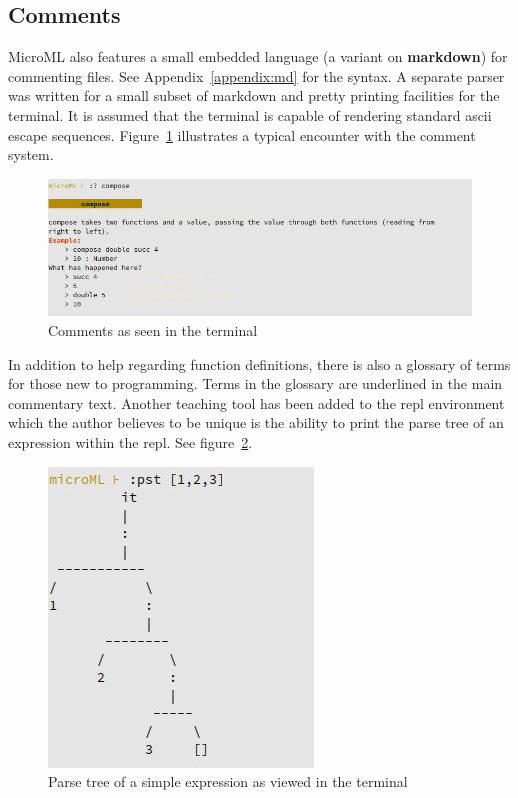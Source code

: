 \documentclass[12pt, a4paper]{report}
\begin{document}
\subsection{Comments}
MicroML also features a small embedded language (a variant on \textbf{markdown}) for commenting
files. See Appendix~\ref{appendix:md} for the syntax. A separate parser was written 
for a small subset of markdown and pretty printing facilities
for the terminal. It is assumed that the terminal is capable of rendering standard ascii
escape sequences. Figure~\ref{fig:comments} illustrates a typical encounter with the comment system.

\begin{figure}
    \includegraphics[width=\textwidth]{images/comment.jpg}
    {\caption{Comments as seen in the terminal}}
    \label{fig:comments}
\end{figure}

In addition to help regarding function definitions, there is also a glossary of terms for those new
to programming. Terms in the glossary are underlined in the main commentary text.  Another teaching 
tool has been added to the repl environment which the author believes to be unique
is the ability to print the parse tree of an expression within the repl. See figure~\ref{fig:tree}.

\begin{figure}
    \label{fig:tree}
    \includegraphics[scale=0.6]{images/tree.jpg}
    {\caption{Parse tree of a simple expression as viewed in the terminal}}
\end{figure}
\end{document}
